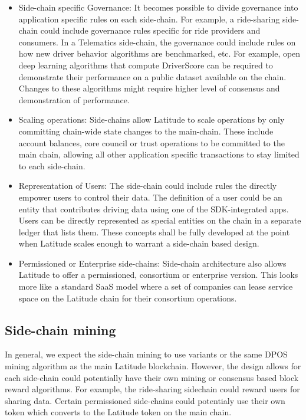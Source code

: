 \begin{itemize}
  \item Side-chain specific Governance: It becomes possible to divide governance into application specific rules on
        each side-chain. For example, a ride-sharing side-chain could include governance rules specific for ride
        providers and consumers. In a Telematics side-chain, the governance could include rules on how new driver
        behavior algorithms are benchmarked, etc.  For example, open deep learning algorithms that compute DriverScore
        can be required to demonstrate their performance on a public dataset available on the chain. Changes to these
        algorithms might require higher level of consensus and demonstration of performance.

  \item Scaling operations: Side-chains allow Latitude to scale operations by only committing chain-wide state changes
      to the main-chain. These include account balances, core council or trust operations to be committed to the main
        chain, allowing all other application specific transactions to stay limited to each side-chain.
   \item Representation of Users: The side-chain could include rules the directly empower users to control their data.  The definition of a
user could be an entity that contributes driving data using one of the SDK-integrated apps.  Users can be directly
represented as special entities on the chain in a separate ledger that lists them. These concepts shall be fully
developed at the point when Latitude scales enough to warrant a side-chain based design.

  \item Permissioned or Enterprise side-chains: Side-chain architecture also allows Latitude to offer a permissioned,
      consortium or enterprise version. This looks more like a standard SaaS model where a set of companies can lease
        service space on the Latitude chain for their consortium operations.
\end{itemize}

\subsection{Side-chain mining}
In general, we expect the side-chain mining to use variants or the same DPOS mining algorithm as the main Latitude
blockchain.  However, the design allows for each side-chain could potentially have their own mining or consensus based
block reward algorithms. For example, the ride-sharing sidechain could reward users for sharing data. Certain
permissioned side-chains could potentialy use their own token which converts to the Latitude token on the main chain.

